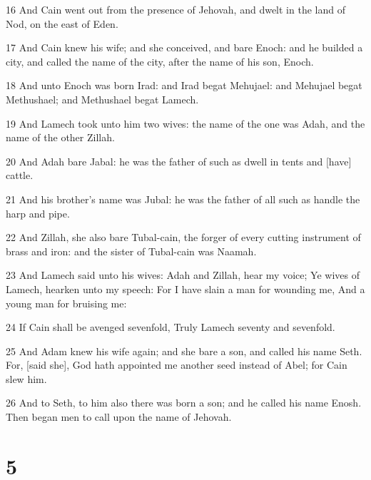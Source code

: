 \par 16 And Cain went out from the presence of Jehovah, and dwelt in the land of Nod, on the east of Eden.
\par 17 And Cain knew his wife; and she conceived, and bare Enoch: and he builded a city, and called the name of the city, after the name of his son, Enoch.
\par 18 And unto Enoch was born Irad: and Irad begat Mehujael: and Mehujael begat Methushael; and Methushael begat Lamech.
\par 19 And Lamech took unto him two wives: the name of the one was Adah, and the name of the other Zillah.
\par 20 And Adah bare Jabal: he was the father of such as dwell in tents and [have] cattle.
\par 21 And his brother's name was Jubal: he was the father of all such as handle the harp and pipe.
\par 22 And Zillah, she also bare Tubal-cain, the forger of every cutting instrument of brass and iron: and the sister of Tubal-cain was Naamah.
\par 23 And Lamech said unto his wives: Adah and Zillah, hear my voice; Ye wives of Lamech, hearken unto my speech: For I have slain a man for wounding me, And a young man for bruising me:
\par 24 If Cain shall be avenged sevenfold, Truly Lamech seventy and sevenfold.
\par 25 And Adam knew his wife again; and she bare a son, and called his name Seth. For, [said she], God hath appointed me another seed instead of Abel; for Cain slew him.
\par 26 And to Seth, to him also there was born a son; and he called his name Enosh. Then began men to call upon the name of Jehovah.

\chapter{5}

